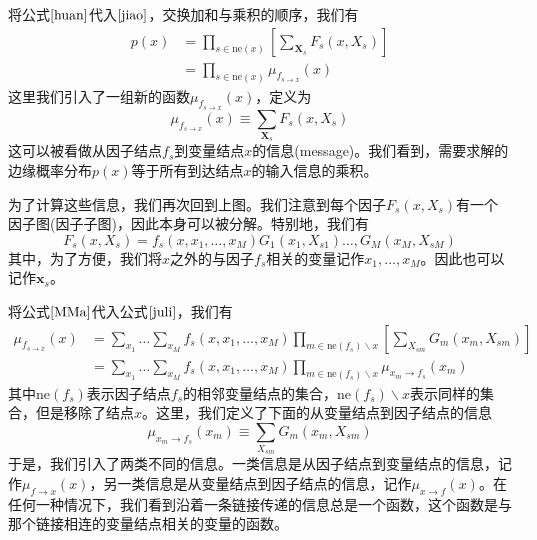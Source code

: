 将公式$\ref{huan}$代入$\ref{jiao}$，交换加和与乘积的顺序，我们有
\begin{equation}
\label{zui}
	\begin{aligned}
		p(x)&=\prod_{s\in \mathrm{ne}(x)}\left[\sum_{\boldsymbol{X}_s}F_s(x,X_s) \right]\\
		&=\prod_{s\in \mathrm{ne}(x)}\mu_{f_{s\to x}}(x)
	\end{aligned}
\end{equation}
这里我们引入了一组新的函数$\mu_{f_{s\to x}}(x)$，定义为
\begin{equation}
\label{juli}
	\mu_{f_{s\to x}}(x)\equiv \sum_{\boldsymbol{X}_s}F_s(x,X_s)
\end{equation}
这可以被看做从因子结点$f_s$到变量结点$x$的信息(message)。我们看到，需要求解的边缘概率分布$p(x)$等于所有到达结点$x$的输入信息的乘积。

为了计算这些信息，我们再次回到上图。我们注意到每个因子$F_s(x,X_s)$有一个因子图(因子子图)，因此本身可以被分解。特别地，我们有
\begin{equation}
\label{MMa}
	F_s(x,X_s)=f_s(x,x_1,\dots,x_M)G_1(x_1,X_{s1})\dots,G_M(x_M,X_{sM})
\end{equation}
其中，为了方便，我们将$x$之外的与因子$f_s$相关的变量记作$x_1,\dots,x_M$。因此也可以记作$\boldsymbol{x}_s$。

将公式$\ref{MMa}$代入公式$\ref{juli}$，我们有
\begin{equation}
\label{lin}
	\begin{aligned}
	\mu_{f_{s\to x}}(x)&=\sum_{x_1}\dots\sum_{x_M}f_s(x,x_1,\dots,x_M)\prod_{m\in \mathrm{ne}(f_s)\backslash x}\left[\sum_{X_{sm}}G_m(x_m,X_{sm}) \right]\\
	&=\sum_{x_1}\dots\sum_{x_M}f_s(x,x_1,\dots,x_M)\prod_{m\in \mathrm{ne}(f_s)\backslash x}\mu_{x_{m}\to f_s}(x_m)
	\end{aligned}
\end{equation}
其中$\mathrm{ne}(f_s)$表示因子结点$f_s$的相邻变量结点的集合，$\mathrm{ne}(f_s)\backslash x$表示同样的集合，但是移除了结点$x$。这里，我们定义了下面的从变量结点到因子结点的信息
\begin{equation}
\label{de}
	\mu_{x_{m}\to f_s}(x_m)\equiv \sum_{X_{sm}}G_m(x_m,X_{sm})
\end{equation}
于是，我们引入了两类不同的信息。一类信息是从因子结点到变量结点的信息，记作$\mu_{f\to x}(x)$，另一类信息是从变量结点到因子结点的信息，记作$\mu_{x\to f}(x)$。在任何一种情况下，我们看到沿着一条链接传递的信息总是一个函数，这个函数是与那个链接相连的变量结点相关的变量的函数。

